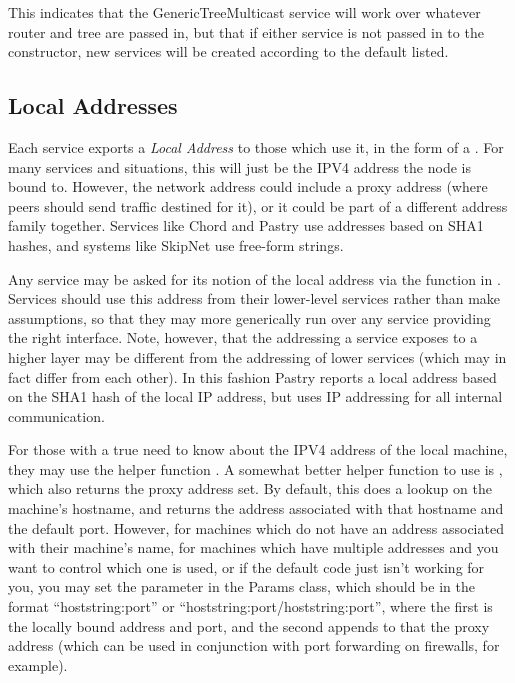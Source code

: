 This indicates that the GenericTreeMulticast service will work over whatever
router and tree are passed in, but that if either service is not passed in to
the constructor, new services will be created according to the default listed.

\subsection{Local Addresses}
\label{sec:localaddrs}

Each service exports a \emph{Local Address} to those which use it, in
the form of a .  For many services and situations, 
this will just be the IPV4 address the node is bound to.  However, 
the network address could include a proxy address (where peers should
send traffic destined for it), or it could be part of a different address
family together.  Services like Chord and Pastry use addresses based on
SHA1 hashes, and systems like SkipNet use free-form strings.

Any service may be asked for its notion of the local address via the
 function in .  Services
should use this address from their lower-level services rather than make
assumptions, so that they may more generically run over any service providing
the right interface.  Note, however, that the addressing a service exposes to a
higher layer may be different from the addressing of lower services (which may
in fact differ from each other).  In this fashion Pastry reports a local
address based on the SHA1 hash of the local IP address, but uses IP addressing
for all internal communication.

For those with a true need to know about the IPV4 address of the local machine,
they may use the helper function .  A somewhat better
helper function to use is , which also returns
the proxy address set.  By default, this does a lookup on the machine's
hostname, and returns the address associated with that hostname and the default
port.  However, for machines which do not have an address associated with their
machine's name, for machines which have multiple addresses and you want to
control which one is used, or if the default code just isn't working for you,
you may set the parameter  in the Params
class, which should be in the format ``hoststring:port'' or
``hoststring:port/hoststring:port'', where the first is the locally bound
address and port, and the second appends to that the proxy address (which can
be used in conjunction with port forwarding on firewalls, for example).

